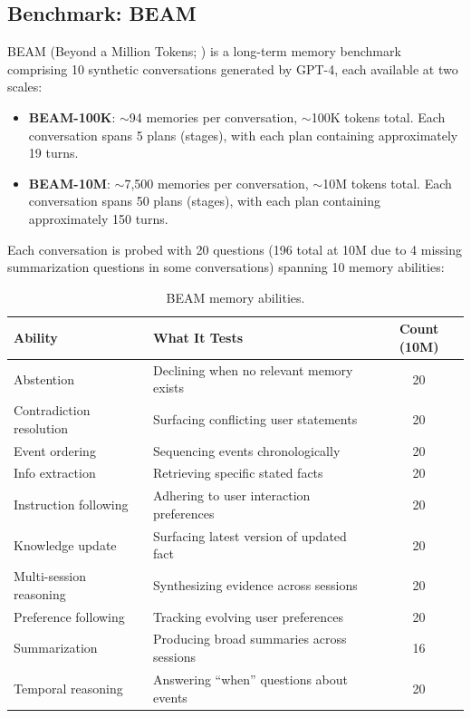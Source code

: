 \documentclass[11pt]{article}
\begin{document}
\subsection{Benchmark: BEAM}
\label{sec:beam}

BEAM (Beyond a Million Tokens; \citealt{Tavakoli2026}) is a long-term
memory benchmark comprising 10 synthetic conversations generated by
GPT-4, each available at two scales:

\begin{itemize}
  \item \textbf{BEAM-100K}: $\sim$94 memories per conversation,
    $\sim$100K tokens total.  Each conversation spans 5 plans
    (stages), with each plan containing approximately 19 turns.

  \item \textbf{BEAM-10M}: $\sim$7,500 memories per conversation,
    $\sim$10M tokens total.  Each conversation spans 50 plans
    (stages), with each plan containing approximately 150 turns.
\end{itemize}

Each conversation is probed with 20 questions (196 total at 10M due
to 4 missing summarization questions in some conversations) spanning
10 memory abilities:

\begin{table}[h]
\centering
\caption{BEAM memory abilities.}
\label{tab:beam-abilities}
\small
\begin{tabular}{llc}
\toprule
Ability & What It Tests & Count (10M) \\
\midrule
Abstention & Declining when no relevant memory exists & 20 \\
Contradiction resolution & Surfacing conflicting user statements & 20 \\
Event ordering & Sequencing events chronologically & 20 \\
Info extraction & Retrieving specific stated facts & 20 \\
Instruction following & Adhering to user interaction preferences & 20 \\
Knowledge update & Surfacing latest version of updated fact & 20 \\
Multi-session reasoning & Synthesizing evidence across sessions & 20 \\
Preference following & Tracking evolving user preferences & 20 \\
Summarization & Producing broad summaries across sessions & 16 \\
Temporal reasoning & Answering ``when'' questions about events & 20 \\
\bottomrule
\end{tabular}
\end{table}
\end{document}
